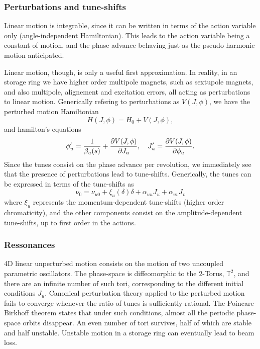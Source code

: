 \subsubsection{Perturbations and tune-shifts}
Linear motion is integrable, since it can be written in terms of the action variable only (angle-independent Hamiltonian). This leads to the action variable being a constant of motion, and the phase advance behaving just as the pseudo-harmonic motion anticipated.

Linear motion, though, is only a useful first approximation. In reality, in an storage ring we have higher order multipole magnets, such as sextupole magnets, and also multipole, alignement and excitation errors, all acting as perturbations to linear motion. Generically refering to perturbations as $V(J, \phi)$, we have the perturbed motion Hamiltonian
\begin{equation}
    H(J,\phi) =H_0 + V(J,\phi),
\end{equation}
and hamilton's equations
\begin{equation}
\phi_u^\prime = \frac{1}{\beta_u(s)}+\pdv{V(J,\phi)}{J_u}, \quad J_u^\prime = \pdv{V(J,\phi)}{\phi_u}.
\end{equation}
Since the tunes consist on the phase advance per revolution, we immediately see that the presence of perturbations lead to tune-shifts. Generically, the tunes can be expressed in terms of the tune-shifts as
$$\nu_0 = \nu_{u0} + \xi_u(\delta) \delta + \alpha_{uu} J_u + \alpha_{uv} J_v$$
where $\xi_u$ represents the momentum-dependent tune-shifts (higher order chromaticity), and the other components consist on the amplitude-dependent tune-shifts, up to first order in the actions.
\subsubsection{Ressonances}
4D linear unperturbed motion consists on the motion of two uncoupled parametric oscillators. The phase-space is diffeomorphic to the 2-Torus, $\mathbb{T}^2$, and there are an infinite number of such tori, corresponding to the different initial conditions $J_u$. Canonical perturbation theory applied to the perturbed motion fails to converge whenever the ratio of tunes is sufficiently rational. The Poincare-Birkhoff theorem states that under such conditions, almost all the periodic phase-space orbits disappear. An even number of tori survives, half of which are stable and half unstable. Unstable motion in a storage ring can eventually lead to beam loss.

